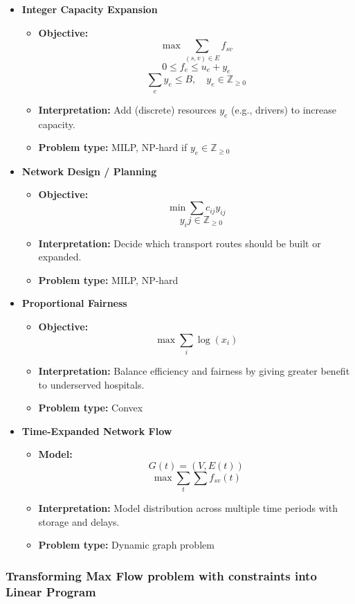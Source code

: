 \begin{itemize}
\item \textbf{Integer Capacity Expansion}
\begin{itemize}
\item \textbf{Objective:}
\[
\max \sum_{(s,v)\in E} f_{sv}
\]
\[
0 \le f_e \le u_e + y_e
\]
\[
\sum_e y_e \le B, \quad y_e \in \mathbb{Z}_{\ge 0}
\]
\item \textbf{Interpretation:} Add (discrete) resources \(y_e\) (e.g., drivers) to increase capacity. 
\item \textbf{Problem type:} MILP, NP-hard if \(y_e \in \mathbb{Z}_{\ge 0}\)
\end{itemize}

\item \textbf{Network Design / Planning}
\begin{itemize}
\item \textbf{Objective:}
\[
\min \sum c_{ij} y_{ij}
\]
\[
\quad y_ij \in \mathbb{Z}_{\ge 0}
\]
\item \textbf{Interpretation:} Decide which transport routes should be built or expanded.
\item \textbf{Problem type:} MILP, NP-hard
\end{itemize}

\item \textbf{Proportional Fairness}
\begin{itemize}
\item \textbf{Objective:}
\[
\max \sum_i \log(x_i)
\]
\item \textbf{Interpretation:} Balance efficiency and fairness by giving greater benefit to underserved hospitals.
\item \textbf{Problem type:} Convex
\end{itemize}


\item \textbf{Time-Expanded Network Flow}
\begin{itemize}
\item \textbf{Model:}
\[
G(t)=(V,E(t))
\]
\[
\max \sum_t \sum f_{sv}(t)
\]
\item \textbf{Interpretation:} Model distribution across multiple time periods with storage and delays.
\item \textbf{Problem type:} Dynamic graph problem
\end{itemize}
\end{itemize}

\subsubsection{Transforming Max Flow problem with constraints into Linear Program}
